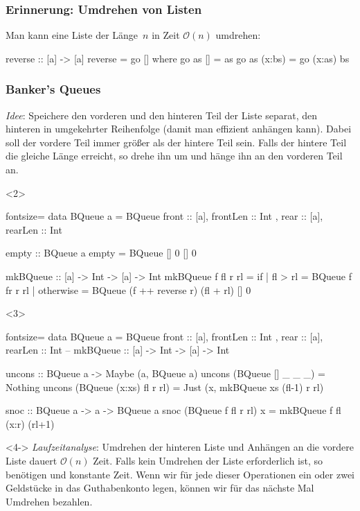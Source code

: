 \documentclass{beamer}
\renewcommand{\O}{\mathcal{O}} %
\begin{document}
\begin{frame}[t,fragile]
  \frametitle{Erinnerung: Umdrehen von Listen}
  Man kann eine Liste der Länge~$n$ in Zeit $\O(n)$ umdrehen:
\begin{haskellcode}
reverse :: [a] -> [a]
reverse = go []
  where go as [] = as
        go as (x:bs) = go (x:as) bs
\end{haskellcode}
\end{frame}

\begin{frame}[t,fragile]
  \frametitle{
    Banker's Queues
    \hfill
    {
      \small \color{greenncs}
    }
  }
  \textit{Idee}: Speichere den vorderen und den hinteren Teil der Liste separat, den hinteren in umgekehrter Reihenfolge (damit man effizient anhängen kann).
  Dabei soll der vordere Teil immer größer als der hintere Teil sein.
  Falls der hintere Teil die gleiche Länge erreicht, so drehe ihn um und hänge ihn an den vorderen Teil an.
\begin{onlyenv}<2>
\begin{haskellcode*}{fontsize=\normalsize}
data BQueue a = BQueue { front :: [a], frontLen :: Int
                       , rear  :: [a], rearLen  :: Int }

empty :: BQueue a
empty = BQueue [] 0 [] 0

mkBQueue :: [a] -> Int -> [a] -> Int
mkBQueue f fl r rl = if
  | fl > rl   = BQueue f fr r rl
  | otherwise = BQueue (f ++ reverse r) (fl + rl) [] 0
\end{haskellcode*}
\end{onlyenv}
\begin{onlyenv}<3>
\begin{haskellcode*}{fontsize=\normalsize}
data BQueue a = BQueue { front :: [a], frontLen :: Int
                       , rear  :: [a], rearLen  :: Int }
-- mkBQueue :: [a] -> Int -> [a] -> Int

uncons :: BQueue a -> Maybe (a, BQueue a)
uncons (BQueue [] _ _ _) = Nothing
uncons (BQueue (x:xs) fl r rl) =
  Just (x, mkBQueue xs (fl-1) r rl)

snoc :: BQueue a -> a -> BQueue a
snoc (BQueue f fl r rl) x = mkBQueue f fl (x:r) (rl+1)
\end{haskellcode*}
\end{onlyenv}

\begin{onlyenv}<4->
  \vspace{0.5cm}
  \textit{Laufzeitanalyse}: Umdrehen der hinteren Liste und Anhängen an die vordere Liste dauert $\O(n)$ Zeit.
  Falls kein Umdrehen der Liste erforderlich ist, so benötigen  und  konstante Zeit.
  Wenn wir für jede dieser Operationen ein oder zwei Geldstücke in das Guthabenkonto legen, können wir für das nächste Mal Umdrehen bezahlen.
\end{onlyenv}


\end{frame}
\end{document}
